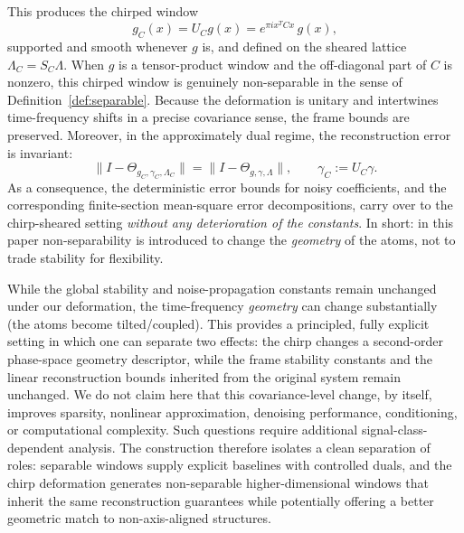 \documentclass[final,1p,times,authoryear]{elsarticle}
\theoremstyle{definition}
\newcommand{\1}{\mathbf{1}}
\begin{document}
{This produces the chirped window
$$
g_C(x)=U_C g(x)=e^{\pi i x^T C x}\,g(x),
$$
supported and smooth whenever $g$ is, and defined on the sheared lattice $\Lambda_C=S_C\Lambda$.
When $g$ is a tensor-product window and the off-diagonal part of $C$ is nonzero, this
chirped window is genuinely non-separable in the sense of Definition~\ref{def:separable}.}
Because the deformation is unitary and intertwines time-frequency shifts in a precise covariance sense, the
frame bounds are preserved. Moreover, in the approximately dual regime, the reconstruction error is invariant:
$$
\|I-\Theta_{g_C,\gamma_C,\Lambda_C}\|
=
\|I-\Theta_{g,\gamma,\Lambda}\|,
\qquad \gamma_C:=U_C\gamma.
$$
As a consequence, the deterministic error bounds for noisy coefficients, and the corresponding finite-section
mean-square error decompositions, {carry over to the chirp-sheared setting \emph{without any deterioration of the constants}.} In short: in this paper non-separability is introduced to change the \emph{geometry} of the atoms,
not to trade stability for flexibility.

While the global stability and noise-propagation constants remain unchanged under our deformation, the
time-frequency \emph{geometry} can change substantially (the atoms become tilted/coupled).
{This provides a principled, fully explicit setting in which one can separate two effects:
the chirp changes a second-order phase-space geometry descriptor, while the frame stability
constants and the linear reconstruction bounds inherited from the original system remain unchanged.
We do not claim here that this covariance-level change, by itself, improves sparsity,
nonlinear approximation, denoising performance, conditioning, or computational complexity.
Such questions require additional signal-class-dependent analysis.}
The construction therefore isolates a clean separation of roles: separable windows supply explicit baselines
with controlled duals, and the chirp deformation generates non-separable higher-dimensional windows that inherit
the same reconstruction guarantees while potentially offering a better geometric match to non-axis-aligned
structures.
\end{document}
